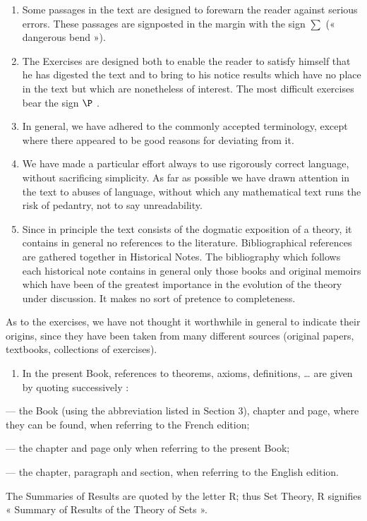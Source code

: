 \begin{enumerate}
\def\labelenumi{\arabic{enumi}.}
\setcounter{enumi}{5}
\item
  Some passages in the text are designed to forewarn the reader against serious errors. These passages are signposted in the margin with the sign \(\sum\) (« dangerous bend »).
\item
  The Exercises are designed both to enable the reader to satisfy himself that he has digested the text and to bring to his notice results which have no place in the text but which are nonetheless of interest. The most difficult exercises bear the sign \(\P\) .
\item
  In general, we have adhered to the commonly accepted terminology, except where there appeared to be good reasons for deviating from it.
\item
  We have made a particular effort always to use rigorously correct language, without sacrificing simplicity. As far as possible we have drawn attention in the text to abuses of language, without which any mathematical text runs the risk of pedantry, not to say unreadability.
\item
  Since in principle the text consists of the dogmatic exposition of a theory, it contains in general no references to the literature. Bibliographical references are gathered together in Historical Notes. The bibliography which follows each historical note contains in general only those books and original memoirs which have been of the greatest importance in the evolution of the theory under discussion. It makes no sort of pretence to completeness.
\end{enumerate}

As to the exercises, we have not thought it worthwhile in general to indicate their origins, since they have been taken from many different sources (original papers, textbooks, collections of exercises).

\begin{enumerate}
\def\labelenumi{\arabic{enumi}.}
\setcounter{enumi}{10}
\tightlist
\item
  In the present Book, references to theorems, axioms, definitions, \ldots{} are given by quoting successively :
\end{enumerate}

--- the Book (using the abbreviation listed in Section 3), chapter and page, where they can be found, when referring to the French edition;

--- the chapter and page only when referring to the present Book;

--- the chapter, paragraph and section, when referring to the English edition.

The Summaries of Results are quoted by the letter R; thus Set Theory, R signifies « Summary of Results of the Theory of Sets ».

